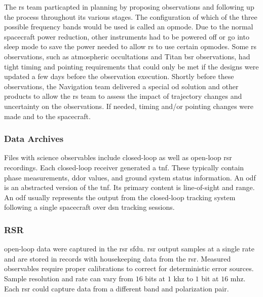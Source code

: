 \documentclass[oneside]{book}
\theoremstyle{mystyle}
\begin{document}
\par
The \gls{rs} team particapted in planning by proposing observations and following up the process throughout its various stages. The configuration of which of the three possible frequency bands would be used is called an \gls{opmode}. Due
to the normal spacecraft power reduction, other instruments had to be powered off or go into sleep mode to save the power needed to allow \gls{rs} to use certain \glspl{opmode}. Some \gls{rs} observations, such as atmospheric \glspl{occultation}
and Titan \gls{bsr} observations, had tight timing and pointing requirements that could only be met if the designs were updated a few days before the observation execution. Shortly before these observations, the Navigation team delivered a special \gls{od} solution and other products to allow the \gls{rs} team to assess the impact of trajectory
changes and uncertainty on the observations. If needed, timing and/or pointing changes
were made and  to the spacecraft.

\subsubsection{Data Archives}

Files with science observables include \gls{closed-loop}  as well as \gls{open-loop} \gls{rsr} recordings. Each \gls{closed-loop} receiver generated a \gls{tnf}. These typically contain  \gls{phase} measurements, \gls{ddor} values, and ground system status information. An \gls{odf} is an abstracted version of the \gls{tnf}. Its primary content is line-of-sight  and range. An \gls{odf} usually represents the output from the \gls{closed-loop} tracking system following a single spacecraft over \gls{dsn} tracking sessions. 

\subsubsection{\footnotesize RSR \label{subsubsec:usr_RSR}}
\Gls{open-loop} data were captured in the \gls{rsr} \gls{sfdu}. \gls{rsr} output samples at a single rate and are stored in records with housekeeping data from the \gls{rsr}. Measured observables require proper calibrations to correct for deterministic error sources. Sample
resolution and rate can vary from $16$ \glspl{bit} at $1$ \gls{khz} to $1$ \gls{bit} at $16$ \gls{mhz}. Each \gls{rsr} could
capture data from a different band and \gls{polarization} pair.
\end{document}
